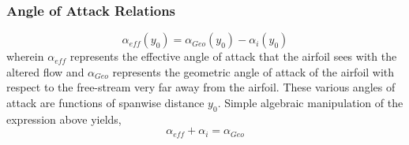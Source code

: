 \documentclass[a4paper, 12pt]{report}
\begin{document}
\begin{center}
\subsubsection{Angle of Attack Relations}
\begin{comment}
\end{comment}
$$\alpha_{eff}(y_{0}) = \alpha_{Geo}(y_{0}) - \alpha_{i}(y_{0})$$
wherein $\alpha_{eff}$ represents the effective angle of attack that the airfoil sees with the altered flow and $\alpha_{Geo}$ represents the geometric angle of attack of the airfoil with respect to the free-stream very far away from the airfoil. These various angles of attack are functions of spanwise distance $y_{0}$. Simple algebraic manipulation of the expression above yields,
\begin{equation}
\alpha_{eff} + \alpha_{i} = \alpha_{Geo}
\label{Various Angles of Attack}
\end{equation}


\end{center}
\end{document}
